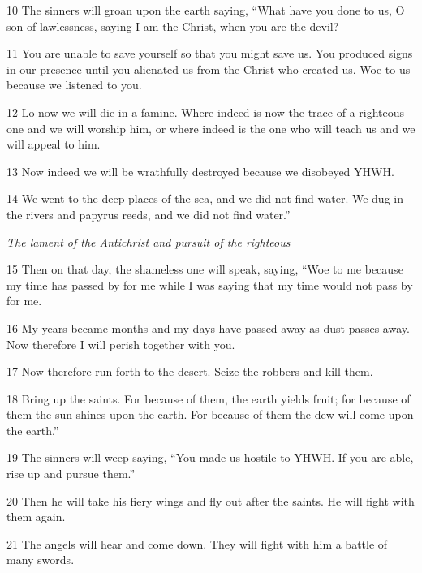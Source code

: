\par 10 The sinners will groan upon the earth saying, “What have you done to us, O son of lawlessness, saying I am the Christ, when you are the devil?

\par 11 You are unable to save yourself so that you might save us. You produced signs in our presence until you alienated us from the Christ who created us. Woe to us because we listened to you.

\par 12 Lo now we will die in a famine. Where indeed is now the trace of a righteous one and we will worship him, or where indeed is the one who will teach us and we will appeal to him.

\par 13 Now indeed we will be wrathfully destroyed because we disobeyed YHWH.

\par 14 We went to the deep places of the sea, and we did not find water. We dug in the rivers and papyrus reeds, and we did not find water.”


\par \textit{The lament of the Antichrist and pursuit of the righteous}


\par 15 Then on that day, the shameless one will speak, saying, “Woe to me because my time has passed by for me while I was saying that my time would not pass by for me.

\par 16 My years became months and my days have passed away as dust passes away. Now therefore I will perish together with you.

\par 17 Now therefore run forth to the desert. Seize the robbers and kill them.

\par 18 Bring up the saints. For because of them, the earth yields fruit; for because of them the sun shines upon the earth. For because of them the dew will come upon the earth.”

\par 19 The sinners will weep saying, “You made us hostile to YHWH. If you are able, rise up and pursue them.”

\par 20 Then he will take his fiery wings and fly out after the saints. He will fight with them again.

\par 21 The angels will hear and come down. They will fight with him a battle of many swords.

